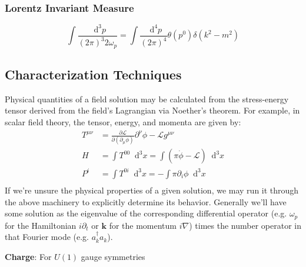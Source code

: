 \documentclass[12pt]{article}
\newcommand{\diff}{\mathop{}\!\mathrm{d}}
\theoremstyle{definition}
\begin{document}
\subsubsection{Lorentz Invariant Measure}
\begin{equation*}
    \int \frac{\diff^3 p}{(2\pi)^3 2 \omega_p} = \int \frac{\diff^4 p}{(2\pi)^4} \theta(p^0) \delta(k^2 - m^2)
\end{equation*}

\subsection{Characterization Techniques}
Physical quantities of a field solution may be calculated from the stress-energy tensor derived from the
field's Lagrangian via Noether's theorem. For example, in scalar field theory, the tensor, energy, and
momenta are given by:
\begin{equation*}
\begin{split}
    T^{\mu\nu} &= \frac{\partial \mathcal{L}}{\partial (\partial_\mu \phi)}  \partial^\nu \phi - \mathcal{L} g^{\mu\nu} \\
    H &= \int T^{00} \diff^3 x = \int (\pi \dot{\phi} - \mathcal{L}) \diff^3 x \\
    P^i &= \int T^{0i} \diff^3 x = - \int \pi \partial_i \phi \diff^3 x \\
\end{split}
\end{equation*}
If we're unsure the physical properties of a given solution, we may run it through the above machinery to
explicitly determine its behavior. Generally we'll have some solution as the eigenvalue of the corresponding
differential operator (e.g. $\omega_p$ for the Hamiltonian $i\partial_t$ or $\bm{k}$ for the momentum $i\nabla$)
times the number operator in that Fourier mode (e.g. $a^\dagger_k a_k$).

\textbf{Charge}: For $U(1)$ gauge symmetries
\end{document}
